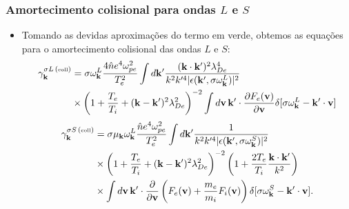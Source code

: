 \documentclass[10pt,aspectratio=1610,lualatex]{beamer}
\begin{document}
\begin{frame}
  \frametitle{Amortecimento colisional para ondas $L$ e $S$}
  \begin{itemize}
    \item Tomando as devidas aproximações do termo em verde, obtemos
    as equações para o amortecimento colisional das ondas $L$ e $S$:
    \vspace{0.2cm}
    \begin{equation*}
      \begin{split}
	\gamma_{\bf k}^{\sigma L\,(\mbox{\tiny coll})}
	&= \sigma \omega_{\bf k}^L
	\frac{4\hat{n}e^4\omega_{pe}^2}{T_e^2}\int d{\bf k}'
	\frac{({\bf k}\cdot {\bf k'})^2\lambda_{De}^4}{k^2k'^4|
	  \epsilon({\bf k'},\sigma\omega_{\bf k}^L)|^2}\\
	&\times \left(1+\frac{T_e}{T_i}+({\bf k}-{\bf k'})^2
	  \lambda_{De}^2\right)^{-2}\int d{\bf v}\, {\bf k'}
	\cdot \frac{\partial F_e({\bf v})}{\partial {\bf v}}
	\delta [\sigma\omega_{\bf k}^L-{\bf k'}\cdot{\bf v}]
      \end{split}
    \end{equation*}
    \vspace{0.3cm}
    \begin{equation*}
      \begin{split}
	\gamma_{\bf k}^{\sigma S\, (\mbox{\tiny coll})}
	&= \sigma\mu_{\bf k}\omega_{\bf k}^L
	\frac{\hat{n}e^4\omega_{pe}^2}{T_e^2}\int d{\bf k}'
	\frac{1}{k^2k'^4 |\epsilon({\bf k'},\sigma\omega_{\bf k}^S)|^2}\\
	&\times \left(1+\frac{T_e}{T_i}+({\bf k}-{\bf k'})^2
	  \lambda_{De}^2\right)^{-2}\left(1+\frac{2T_e}{T_i}
	  \frac{{\bf k}\cdot{\bf k}'}{k^2}\right)\\
	&\times \int d{\bf v}\, {\bf k'}
	\cdot\frac{\partial}{\partial{\bf v}}
	\left(F_e({\bf v})+\frac{m_e}{m_i}F_i({\bf v})\right)
	\delta[\sigma\omega_{\bf k}^S-{\bf k'}\cdot{\bf v}].
      \end{split}
    \end{equation*}
  \end{itemize}
\end{frame}
\end{document}

